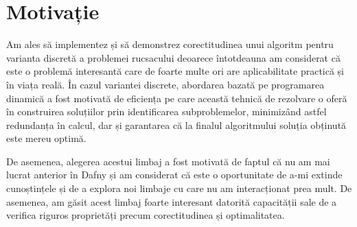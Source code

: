 \chapter*{Motivație} 

Am ales să implementez și să demonstrez corectitudinea unui algoritm pentru varianta discretă a problemei rucsacului deoarece întotdeauna am considerat că este o problemă interesantă care de foarte multe ori are aplicabilitate practică și în viața reală. În cazul variantei discrete, abordarea bazată pe programarea dinamică a fost motivată de eficiența pe care această tehnică de rezolvare o oferă în construirea soluțiilor prin identificarea subproblemelor, minimizând astfel redundanța în calcul, dar și garantarea că la finalul algoritmului soluția obținută este mereu optimă. \par
De asemenea, alegerea acestui limbaj a fost motivată de faptul că nu am mai lucrat anterior în Dafny și am considerat că este o oportunitate de a-mi extinde cunoștințele și de a explora noi limbaje cu care nu am interacționat prea mult. De asemenea, am găsit acest limbaj foarte interesant datorită capacității sale de a verifica riguros proprietăți precum corectitudinea și optimalitatea. 